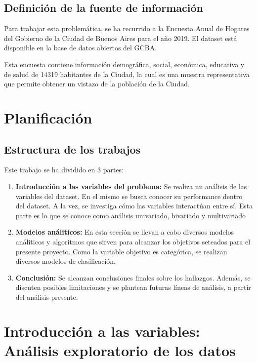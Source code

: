 \documentclass[a4paper]{article}
\begin{document}
    \subsection{Definición de la fuente de información}

        Para trabajar esta problemática, se ha recurrido a la Encuesta Anual de Hogares del Gobierno de la Ciudad de Buenos Aires para el año 2019. El dataset está disponible en la base de datos abiertos del GCBA.

        Esta encuesta contiene información demográfica, social, económica, educativa y de salud de 14319 habitantes de la Ciudad, la cual es una muestra representativa que permite obtener un vistazo de la población de la Ciudad.

\section{Planificación}

    \subsection*{Estructura de los trabajos}

    Este trabajo se ha dividido en 3 partes:
    \begin{enumerate}
        \item \textbf{Introducción a las variables del problema:} Se realiza un análisis de las variables del dataset. En el mismo se busca conocer su performance dentro del dataset. A la vez, se investiga cómo las variables interactúan entre sí. Esta parte es lo que se conoce como análisis univariado, bivariado y multivariado
        \item \textbf{Modelos análiticos:} En esta sección se llevan a cabo diversos modelos análiticos y algoritmos que sirven para alcanzar los objetivos seteados para el presente proyecto. Como la variable objetivo es categórica, se realizan diversos modelos de clasificación.
        \item \textbf{Conclusión:} Se alcanzan conclusiones finales sobre los hallazgos. Además, se discuten posibles limitaciones y se plantean futuras líneas de análisis, a partir del análisis presente.
        
    \end{enumerate}

\section{Introducción a las variables: Análisis exploratorio de los datos}
 
\end{document}
